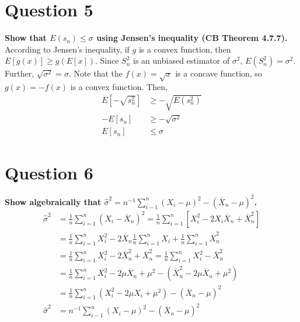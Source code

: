 \documentclass{article}
\newcommand{\olx}[1]{\overline{X}_{#1}}
\newcommand{\est}[1]{\frac{1}{#1}\sum_{i=1}^{#1}}
\begin{document}

\section*{Question 5}
\textbf{Show that $E(s_n)\leq\sigma$ using Jensen's inequality (CB Theorem 4.7.7).}
\bigskip \\
According to Jensen's inequality, if $g$ is a convex function, then $E[g(x)]\geq g(E[x])$. Since $S_n^2$ is an unbiased estimator of $\sigma^2$, $E(S_n^2)=\sigma^2$. Further, $\sqrt{\sigma^2}=\sigma$. Note that the $f(x)=\sqrt{x}$ is a concave function, so $g(x)=-f(x)$ is a convex function. Then,
\begin{align*}
	E\left[-\sqrt{s_n^2}\right]	&\geq-\sqrt{E(s^2_n)}	\\
	-E\left[s_n\right]			&\geq-\sqrt{\sigma^2}	\\
	E\left[s_n\right]			&\leq\sigma
\end{align*}



\section*{Question 6}
\textbf{Show algebraically that $\hat{\sigma}^2=n^{-1}\sum_{i-1}^n(X_i-\mu)^2-(\overline{X}_n-\mu)^2$.}
\bigskip \\
\begin{align*}
	\hat{\sigma}^2 	&= \est{n}(X_i-\olx{n})^2 = \est{n}\left[X_i^2 - 2X_i\olx{n} + \olx{n}^2\right]	\\
					&= \est{n}X_i^2 - 2\olx{n}\est{n}X_i + \est{n}\olx{n}^2 \\
					&= \est{n}X_i^2 - 2\olx{n}^2 + \olx{n}^2 = \est{n}X_i^2 - \olx{n}^2	\\
					&= \est{n}X_i^2 -2\mu\olx{n} + \mu^2 - (\olx{n}^2 -2\mu\olx{n} + \mu^2) \\
					&= \est{n}(X_i^2 -2\mu X_i + \mu^2 ) - (\overline{X}_n-\mu)^2 \\
	\hat{\sigma}^2 	&= n^{-1}\sum_{i-1}^n(X_i-\mu)^2-(\overline{X}_n-\mu)^2
\end{align*}

\end{document}
